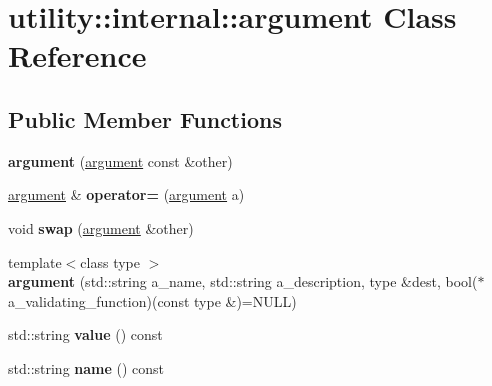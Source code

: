 \hypertarget{classutility_1_1internal_1_1argument}{}\section{utility\+:\+:internal\+:\+:argument Class Reference}
\label{classutility_1_1internal_1_1argument}
\subsection*{Public Member Functions}
\begin{DoxyCompactItemize}
\item 
\hypertarget{classutility_1_1internal_1_1argument_af6ab812c428e192a5f7899266c5a5338}{}{\bfseries argument} (\hyperlink{classutility_1_1internal_1_1argument}{argument} const \&other)\label{classutility_1_1internal_1_1argument_af6ab812c428e192a5f7899266c5a5338}

\item 
\hypertarget{classutility_1_1internal_1_1argument_a88b0751a8199703697ff6b3c6690743a}{}\hyperlink{classutility_1_1internal_1_1argument}{argument} \& {\bfseries operator=} (\hyperlink{classutility_1_1internal_1_1argument}{argument} a)\label{classutility_1_1internal_1_1argument_a88b0751a8199703697ff6b3c6690743a}

\item 
\hypertarget{classutility_1_1internal_1_1argument_a3ec65a22ddb7522c5a6d28612826f232}{}void {\bfseries swap} (\hyperlink{classutility_1_1internal_1_1argument}{argument} \&other)\label{classutility_1_1internal_1_1argument_a3ec65a22ddb7522c5a6d28612826f232}

\item 
\hypertarget{classutility_1_1internal_1_1argument_ab2b98f15de7befa290e26f679dbceea2}{}{\footnotesize template$<$class type $>$ }\\{\bfseries argument} (std\+::string a\+\_\+name, std\+::string a\+\_\+description, type \&dest, bool($\ast$a\+\_\+validating\+\_\+function)(const type \&)=N\+U\+L\+L)\label{classutility_1_1internal_1_1argument_ab2b98f15de7befa290e26f679dbceea2}

\item 
\hypertarget{classutility_1_1internal_1_1argument_a77c48ce9d5fdda0ac93cff3247e4e260}{}std\+::string {\bfseries value} () const \label{classutility_1_1internal_1_1argument_a77c48ce9d5fdda0ac93cff3247e4e260}

\item 
\hypertarget{classutility_1_1internal_1_1argument_a86b28ac5ec5611eec6f84976786767ed}{}std\+::string {\bfseries name} () const \label{classutility_1_1internal_1_1argument_a86b28ac5ec5611eec6f84976786767ed}


\end{DoxyCompactItemize}
